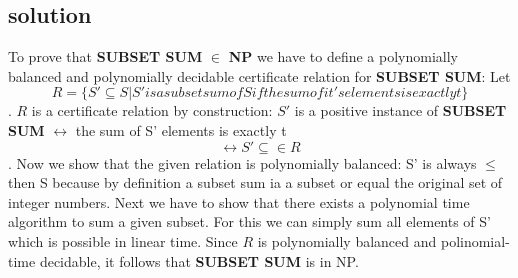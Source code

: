 \subsection{solution}

To prove that \textbf{SUBSET SUM} $\in$ \textbf{NP} we have to define a polynomially balanced and polynomially decidable certificate relation for \textbf{SUBSET SUM}:
\newline
\newline
Let $$R=\{S'\subseteq S | S' is a subset sum of S if the sum of it's elements is exactly t\}$$.
\newline
$R$ is a certificate relation by construction: $S'$ is a positive instance of \textbf{SUBSET SUM} $\leftrightarrow$ the sum of S' elements is exactly t $$\leftrightarrow S' \subseteq \in R$$.
\newline
\newline
Now we show that the given relation is polynomially balanced:
\newline
S' is always $\leq$ then S because by definition a subset sum ia a subset or equal the original set of integer numbers.
\newline
\newline
Next we have to show that there exists a polynomial time algorithm to sum a given subset. For this we can simply sum all elements of S' which is possible in linear time.
\newline
\newline
Since $ R $ is polynomially balanced and polinomial-time decidable, it follows that \textbf{SUBSET SUM} is in NP.

